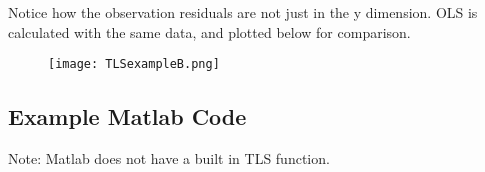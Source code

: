 Notice how the observation residuals are not just in the y dimension.  OLS is calculated with the same data, and plotted below for comparison.

\begin{figure}[H]
	\centering
	\texttt{[image: TLSexampleB.png]}
\end{figure}
\clearpage
\subsection{Example Matlab Code}


Note: Matlab does not have a built in TLS function.